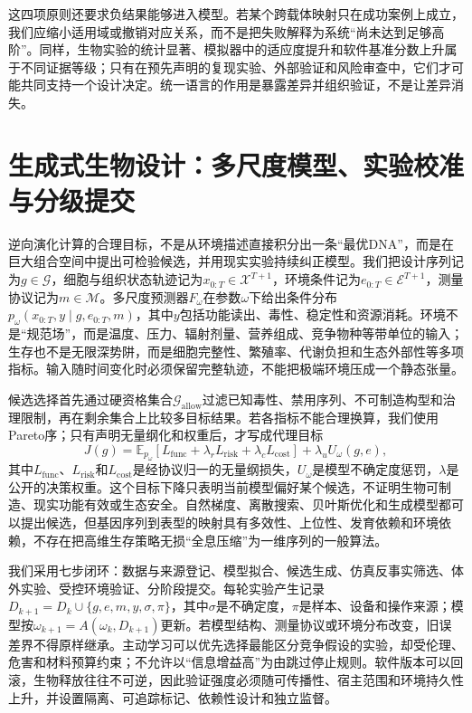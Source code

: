 这四项原则还要求负结果能够进入模型。若某个跨载体映射只在成功案例上成立，我们应缩小适用域或撤销对应关系，而不是把失败解释为系统“尚未达到足够高阶”。同样，生物实验的统计显著、模拟器中的适应度提升和软件基准分数上升属于不同证据等级；只有在预先声明的复现实验、外部验证和风险审查中，它们才可能共同支持一个设计决定。统一语言的作用是暴露差异并组织验证，不是让差异消失。

\section{生成式生物设计：多尺度模型、实验校准与分级提交}
\label{sec:reverse_evolutionary_computation}

逆向演化计算的合理目标，不是从环境描述直接积分出一条“最优DNA”，而是在巨大组合空间中提出可检验候选，并用现实实验持续纠正模型。我们把设计序列记为$g\in\mathcal{G}$，细胞与组织状态轨迹记为$x_{0:T}\in\mathcal{X}^{T+1}$，环境条件记为$e_{0:T}\in\mathcal{E}^{T+1}$，测量协议记为$m\in\mathcal{M}$。多尺度预测器$F_\omega$在参数$\omega$下给出条件分布$p_\omega(x_{0:T},y\mid g,e_{0:T},m)$，其中$y$包括功能读出、毒性、稳定性和资源消耗。环境不是“规范场”，而是温度、压力、辐射剂量、营养组成、竞争物种等带单位的输入；生存也不是无限深势阱，而是细胞完整性、繁殖率、代谢负担和生态外部性等多项指标。输入随时间变化时必须保留完整轨迹，不能把极端环境压成一个静态张量。

候选选择首先通过硬资格集合$\mathcal{G}_{\mathrm{allow}}$过滤已知毒性、禁用序列、不可制造构型和治理限制，再在剩余集合上比较多目标结果。若各指标不能合理换算，我们使用Pareto序；只有声明无量纲化和权重后，才写成代理目标
\begin{equation}
J(g)=\mathbb{E}_{p_\omega}\!\left[L_{\mathrm{func}}+\lambda_rL_{\mathrm{risk}}+\lambda_cL_{\mathrm{cost}}\right]
+\lambda_u U_\omega(g,e),
\end{equation}
其中$L_{\mathrm{func}}$、$L_{\mathrm{risk}}$和$L_{\mathrm{cost}}$是经协议归一的无量纲损失，$U_\omega$是模型不确定度惩罚，$\lambda$是公开的决策权重。这个目标下降只表明当前模型偏好某个候选，不证明生物可制造、现实功能有效或生态安全。自然梯度、离散搜索、贝叶斯优化和生成模型都可以提出候选，但基因序列到表型的映射具有多效性、上位性、发育依赖和环境依赖，不存在把高维生存策略无损“全息压缩”为一维序列的一般算法。

我们采用七步闭环：数据与来源登记、模型拟合、候选生成、仿真反事实筛选、体外实验、受控环境验证、分阶段提交。每轮实验产生记录$D_{k+1}=D_k\cup\{g,e,m,y,\sigma,\pi\}$，其中$\sigma$是不确定度，$\pi$是样本、设备和操作来源；模型按$\omega_{k+1}=A(\omega_k,D_{k+1})$更新。若模型结构、测量协议或环境分布改变，旧误差界不得原样继承。主动学习可以优先选择最能区分竞争假设的实验，却受伦理、危害和材料预算约束；不允许以“信息增益高”为由跳过停止规则。软件版本可以回滚，生物释放往往不可逆，因此验证强度必须随可传播性、宿主范围和环境持久性上升，并设置隔离、可追踪标记、依赖性设计和独立监督。

